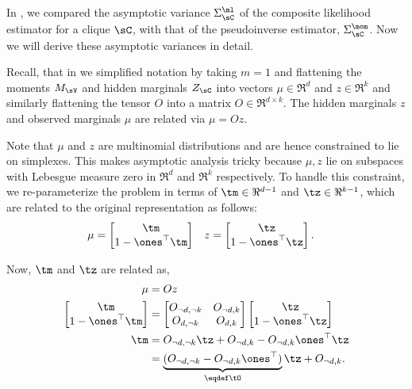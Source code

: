 \subsection{}
\label{app:pw-proof}

In , we compared the asymptotic variance
  $\Sigma^\ml_\sC$ of the composite likelihood estimator for a clique
  $\sC$, with that of the pseudoinverse estimator, $\Sigma^\mom_\sC$. 
  Now we will derive these asymptotic variances in detail.

Recall, that in  we simplified notation by taking
  $m=1$ and flattening the moments $M_\sV$ and hidden marginals $Z_\sC$
  into vectors $\mu \in \Re^d$ and $z \in \Re^k$ and similarly
  flattening the tensor $O$ into a matrix $O \in \Re^{d\times
  k}$.
The hidden marginals $z$ and observed marginals $\mu$ are related via
  $\mu = O z$.

Note that $\mu$ and $z$ are multinomial distributions and are hence
constrained to lie on simplexes. This makes asymptotic analysis tricky
because $\mu, z$ lie on subspaces with Lebesgue measure zero in $\Re^d$
and $\Re^k$ respectively.
To handle this constraint, we re-parameterize the problem in terms of
  $\tm \in \Re^{d-1}$ and $\tz \in \Re^{k-1}$, 
which are related to the original representation as follows:
\begin{align*}
  \mu &= 
    \begin{bmatrix}
      \tm \\
      1 - \ones^\top\tm
    \end{bmatrix} 
  &
  z &= 
    \begin{bmatrix}
      \tz \\
      1 - \ones^\top\tz
    \end{bmatrix}.
\end{align*}

Now, $\tm$ and $\tz$ are related as,
\begin{align*}
  \mu &= O z \\
  \begin{bmatrix}
    \tm \\
    1 - \ones^\top\tm
  \end{bmatrix} 
  &=
    \begin{bmatrix}
      O_{\neg d,\neg k} & O_{\neg d, k} \\ 
      O_{d,\neg k} & O_{d, k} \\ 
    \end{bmatrix}
    \begin{bmatrix}
      \tz \\
      1 - \ones^\top\tz
    \end{bmatrix} \\
  \tm &= O_{\neg d,\neg k} \tz + O_{\neg d, k} - O_{\neg d, k} \ones^\top \tz \\
      &= \underbrace{(O_{\neg d,\neg k} - O_{\neg d, k} \ones^\top )}_{\eqdef \tO} \tz +  O_{\neg d,k}.
\end{align*}

